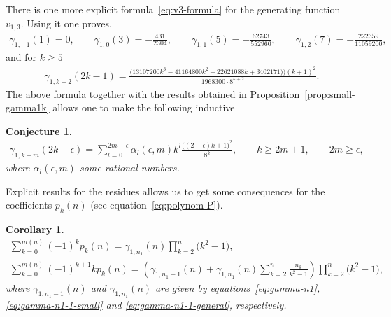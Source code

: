 \documentclass[pdftex]{sigma}
\numberwithin{equation}{section}
\newtheorem{Corollary}[Theorem]{Corollary}
\newtheorem{Conjecture}[Theorem]{Conjecture}
\begin{document}
\begin{Remark}There is one more explicit formula~\eqref{eq:v3-formula} for the generating function $v_{1,3}$. Using it one proves,
\begin{gather*}
\gamma_{1,-1}(1)=0,\qquad
\gamma_{1,0}(3)=-\frac{431}{2304},\qquad
\gamma_{1,1}(5)=-\frac{62743}{552960},\qquad
\gamma_{1,2}(7)=-\frac{222359}{11059200},
\end{gather*}
and for $k\geq5$
\begin{gather*}
\gamma_{1,k-2}(2k-1)=\frac{\big(13107200k^3-41164800k^2-22621088k+3402171\big))(k+1)^2}{1968300\cdot8^{k+2}}.
\end{gather*}
The above formula together with the results obtained in Proposition~\ref{prop:small-gamma1k} allows one to make the following inductive
\begin{Conjecture}
\begin{gather*}
\gamma_{1,k-m}(2k-\epsilon)=\sum\limits_{l=0}^{2m-\epsilon}\alpha_l(\epsilon,m)k^l\frac{\big((2-\epsilon)k+1\big)^2}{8^k},
\qquad k\geq 2m+1,\qquad 2m\geq\epsilon,
\end{gather*}
where $\alpha_l(\epsilon,m)$ some rational numbers.
\end{Conjecture}
\end{Remark}

Explicit results for the residues allows us to get some consequences for the coefficients $p_k(n)$ (see equation~\eqref{eq:polynom-P}).
\begin{Corollary}\label{cor:gamma1n-pkn}
\begin{gather*}
\sum\limits_{k=0}^{m(n)}(-1)^kp_k(n)=\gamma_{1,n_1}(n)\prod\limits_{k=2}^{n}\big(k^2-1\big),\\
\sum\limits_{k=0}^{m(n)}(-1)^{k+1}kp_k(n)=\left(\gamma_{1,n_1-1}(n)+\gamma_{1,n_1}(n)\sum\limits_{k=2}^n\frac{n_k}{k^2-1}\right)
\prod\limits_{k=2}^{n}\big(k^2-1\big),
\end{gather*}
where $\gamma_{1,n_1-1}(n)$ and $\gamma_{1,n_1}(n)$ are given by equations~\eqref{eq:gamma-n1}, \eqref{eq:gamma-n1-1-small} and \eqref{eq:gamma-n1-1-general}, respectively.
\end{Corollary}
\end{document}
